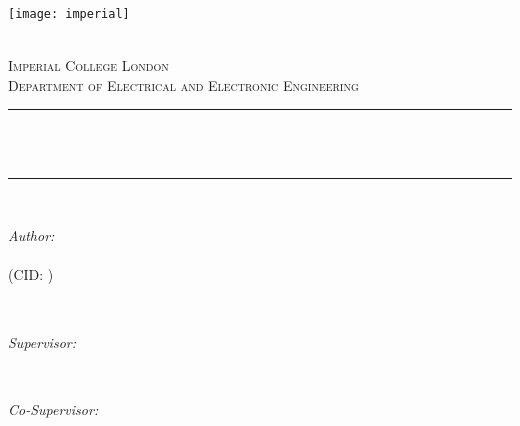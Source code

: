 \begin{titlepage}

\newcommand{\HRule}{\rule{\linewidth}{0.5mm}} %


\texttt{[image: imperial]} %


\center %

\quad\\[1.5cm]
\textsc{\Large Imperial College London}\\[0.5cm] %
\textsc{\large Department of Electrical and Electronic Engineering}\\[1cm] %

\makeatletter
\HRule \\[0.8cm]
{ \LARGE \textbf{\projecttitle}}\\[0.4cm] %
\HRule \\[1.5cm]


\begin{minipage}[t]{0.31\textwidth}
\centering
\large
\emph{Author:}\\
\articleauthor\\
(CID: \cid) %
\end{minipage}
~
\begin{minipage}[t]{0.31\textwidth}
\centering
\large
\emph{Supervisor:} \\
\projectsupervisor %
\end{minipage}
~
\begin{minipage}[t]{0.31\textwidth}
\centering
\large
\emph{Co-Supervisor:} \\
\projectcosupervisor %
\end{minipage}\\[3cm]
\makeatother



\end{titlepage}
